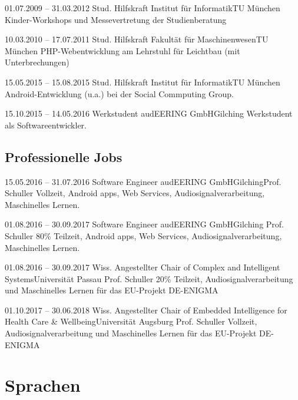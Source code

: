\documentclass[%
xcolor=svgnames,%
style=classic,%
]{komacv}
\begin{document}
\cventry
{01.07.2009 \newline -- 31.03.2012}
{Stud. Hilfskraft}
{Institut f\"ur Informatik}{TU M\"unchen}{}
{Kinder-Workshops und Messevertretung der Studienberatung}

\cventry
{10.03.2010 \newline -- 17.07.2011}
{Stud. Hilfskraft}
{Fakult\"at f\"ur Maschinenwesen}{TU M\"unchen}{}
{PHP-Webentwicklung am Lehrstuhl f\"ur Leichtbau (mit Unterbrechungen)}

\cventry
{15.05.2015 \newline -- 15.08.2015}
{Stud. Hilfskraft}
{Institut f\"ur Informatik}{TU M\"unchen}{}
{Android-Entwicklung (u.a.) bei der Social Commputing Group.}

\cventry
{15.10.2015 \newline -- 14.05.2016}
{Werkstudent}
{audEERING GmbH}{Gilching}{}
{Werkstudent als Softwareentwickler.}


\subsection{Professionelle Jobs}

\cventry
{15.05.2016 \newline -- 31.07.2016}
{Software Engineer}
{audEERING GmbH}{Gilching}{Prof. Schuller}
{Vollzeit, Android apps, Web Services, Audiosignalverarbeitung, Maschinelles Lernen.}

\cventry
{01.08.2016 \newline -- 30.09.2017}
{Software Engineer}
{audEERING GmbH}{Gilching}
{Prof. Schuller}
{80\% Teilzeit, Android apps, Web Services, Audiosignalverarbeitung, Maschinelles Lernen.}

\cventry
{01.08.2016 \newline -- 30.09.2017}
{Wiss. Angestellter}
{Chair of Complex and Intelligent Systems}{Universit\"at Passau}
{Prof. Schuller}
{20\% Teilzeit, Audiosignalverarbeitung und Maschinelles Lernen f\"ur das EU-Projekt DE-ENIGMA}

\cventry
{01.10.2017 \newline -- 30.06.2018}
{Wiss. Angestellter}
{Chair of Embedded Intelligence for Health Care \& Wellbeing}{Universit\"at Augsburg}
{Prof. Schuller}
{Vollzeit, Audiosignalverarbeitung und Maschinelles Lernen f\"ur das EU-Projekt DE-ENIGMA}

\section{Sprachen}
\end{document}
